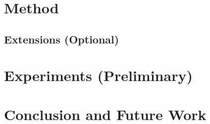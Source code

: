 \documentclass[11pt]{article}
\begin{document}
\section{Method}

\subsection{Extensions (Optional)}


\section{Experiments (Preliminary)}


\section{Conclusion and Future Work}


% 
% 
\end{document}

